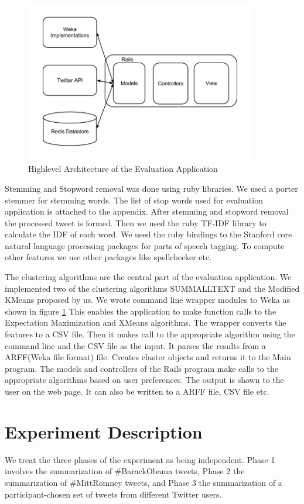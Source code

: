 \begin{figure}[hbtp]
\centering
\includegraphics[width=0.9\textwidth]{Chapter-5/figs/evaluation_app_arch}
\caption{Highlevel Architecture of the Evaluation Application}
\label{fig:evalapp1}
\end{figure}

Stemming and Stopword removal was done using ruby libraries. We used a porter stemmer for stemming words. The list of stop words used for evaluation application is attached to the appendix. After stemming and stopword removal the processed tweet is formed. Then we used the ruby TF-IDF library to calculate the IDF of each word. We used the ruby bindings to the Stanford core natural language processing packages for parts of speech tagging. To compute other features we use other packages like spellchecker etc. 

The clustering algorithms are the central part of the evaluation application. We implemented two of the clustering algorithms SUMMALLTEXT and the Modified KMeans proposed by us. We wrote command line wrapper modules to Weka as shown in figure \ref{fig:evalapp1} This enables the application to make function calls to the Expectation Maximization and XMeans algorithms. The wrapper converts the features to a CSV file. Then it makes call to the appropriate algorithm using the command line and the CSV file as the input. It parses the results from a ARFF(Weka file format) file. Creates cluster objects and returns it to the Main program. The models and controllers of the Rails program make calls to the appropriate algorithms based on user preferences. The output is shown to the user on the web page. It can  also be written to a ARFF file, CSV file etc. 


\section{Experiment Description}
We treat the three phases of the experiment as being independent.
Phase 1 involves the summarization of \#BarackObama tweets, Phase 2
the summarization of \#MittRomney tweets, and Phase 3 the
summarization of a participant-chosen set of tweets from different
Twitter users.

